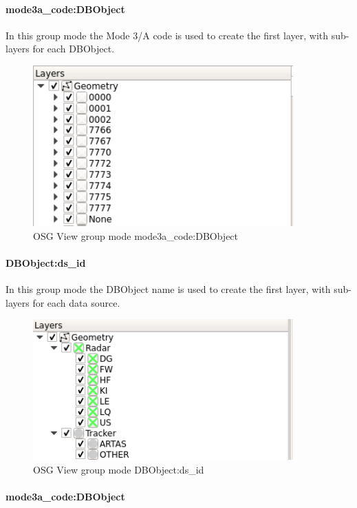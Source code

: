 \paragraph{mode3a\_code:DBObject}

In this group mode the Mode 3/A code is used to create the first layer, with sub-layers for each DBObject.

\begin{figure}[H]
    \includegraphics[width=10cm,frame]{../screenshots/osgview_group_ma_dbo.png}
  \caption{OSG View group mode mode3a\_code:DBObject}
\end{figure}

\paragraph{DBObject:ds\_id}

In this group mode the DBObject name is used to create the first layer, with sub-layers for each data source.

\begin{figure}[H]
    \includegraphics[width=10cm,frame]{../screenshots/osgview_group_dbo_ds.png}
  \caption{OSG View group mode DBObject:ds\_id}
\end{figure}

\paragraph{mode3a\_code:DBObject}

